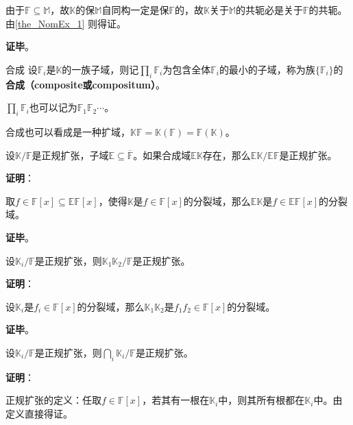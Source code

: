 
由于$\mathbb{F}\subseteq\mathbb{M}$，故$\mathbb{K}$的保$\mathbb{M}$自同构一定是保$\mathbb{F}$的，故$\mathbb{K}$关于$\mathbb{M}$的共轭必是关于$\mathbb{F}$的共轭。由\autoref{the_NomEx_1} 则得证。

\textbf{证毕}。





\begin{definition}{合成}
设$\mathbb{F}_i$是$\mathbb{K}$的一族子域，则记$\prod_{i}\mathbb{F}_i$为包含全体$\mathbb{F}_i$的最小的子域，称为族$\{\mathbb{F}_i\}$的\textbf{合成（composite或compositum）}。

$\prod_{i}\mathbb{F}_i$也可以记为$\mathbb{F}_1\mathbb{F}_2\cdots$。
\end{definition}


合成也可以看成是一种扩域，$\mathbb{K}\mathbb{F}=\mathbb{K}(\mathbb{F})=\mathbb{F}(\mathbb{K})$。


\begin{theorem}{}\label{the_NomEx_7}
设$\mathbb{K}/\mathbb{F}$是正规扩张，子域$\mathbb{E}\subseteq\overline{\mathbb{F}}$。如果合成域$\mathbb{EK}$存在，那么$\mathbb{EK}/\mathbb{EF}$是正规扩张。
\end{theorem}

\textbf{证明}：

取$f\in\mathbb{F}[x]\subseteq\mathbb{EF}[x]$，使得$\mathbb{K}$是$f\in\mathbb{F}[x]$的分裂域，那么$\mathbb{EK}$是$f\in\mathbb{EF}[x]$的分裂域。

\textbf{证毕}。






\begin{theorem}{}
设$\mathbb{K}_i/\mathbb{F}$是正规扩张，则$\mathbb{K}_1\mathbb{K}_2/\mathbb{F}$是正规扩张。
\end{theorem}


\textbf{证明}：

设$\mathbb{K}_i$是$f_i\in\mathbb{F}[x]$的分裂域，那么$\mathbb{K}_1\mathbb{K}_2$是$f_1f_2\in\mathbb{F}[x]$的分裂域。

\textbf{证毕}。


\begin{theorem}{}\label{the_NomEx_2}
设$\mathbb{K}_i/\mathbb{F}$是正规扩张，则$\bigcap_{i}\mathbb{K}_i/\mathbb{F}$是正规扩张。
\end{theorem}

\textbf{证明}：

正规扩张的定义：任取$f\in\mathbb{F}[x]$，若其有一根在$\mathbb{K}_i$中，则其所有根都在$\mathbb{K}_i$中。由定义直接得证。

